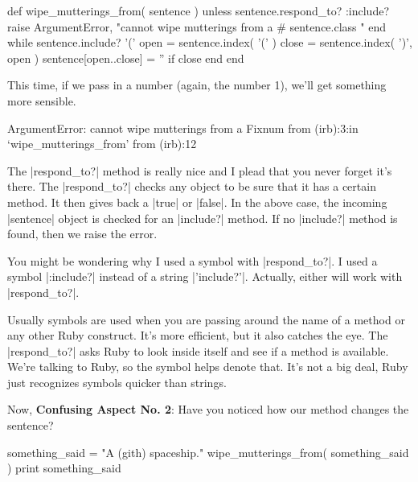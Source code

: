 \documentclass[12pt,twoside]{report}
\begin{document}
\begin{rubycode}

 def wipe_mutterings_from( sentence )
   unless sentence.respond_to? :include?
     raise ArgumentError,
       "cannot wipe mutterings from a #{ sentence.class }"
   end
   while sentence.include? '('
     open = sentence.index( '(' )
     close = sentence.index( ')', open )
     sentence[open..close] = '' if close
   end
 end

\end{rubycode}


This time, if we pass in a number (again, the number 1), we'll get
something more sensible.


\begin{consolecode}

 ArgumentError: cannot wipe mutterings from a Fixnum
         from (irb):3:in `wipe_mutterings_from'
         from (irb):12

\end{consolecode}


The \rubyinline|respond_to?| method is really nice and
I plead that you never forget it's there.  The
\rubyinline|respond_to?| checks any object to be sure
that it has a certain method.  It then gives back a
\rubyinline|true| or
\rubyinline|false|.  In the above case, the incoming
\rubyinline|sentence| object is checked for an
\rubyinline|include?| method.  If no
\rubyinline|include?| method is found, then we raise
the error.

You might be wondering why I used a symbol with
\rubyinline|respond_to?|.  I used a symbol
\rubyinline|:include?| instead of a string
\rubyinline|'include?'|.  Actually, either will work
with \rubyinline|respond_to?|.

Usually symbols are used when you are passing around the name of a
method or any other Ruby construct. It's more efficient, but it also
catches the eye.  The \rubyinline|respond_to?| asks
Ruby to look inside itself and see if a method is available.  We're
talking to Ruby, so the symbol helps denote that.  It's not a big
deal, Ruby just recognizes symbols quicker than strings.

Now, {\bf Confusing Aspect No. 2}: Have you noticed how our method
changes the sentence?


\begin{rubycode}

 something_said = "A (gith) spaceship."
 wipe_mutterings_from( something_said )
 print something_said

\end{rubycode}
\end{document}
